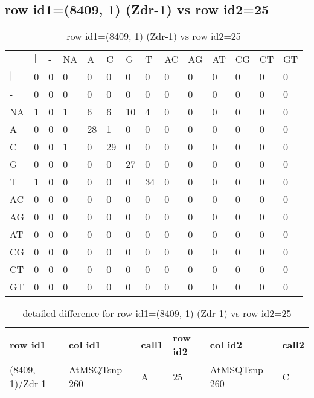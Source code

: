 \subsection{row id1=(8409, 1) (Zdr-1) vs row id2=25}
\begin{center}
\begin{longtable}{|l|l|l|l|l|l|l|l|l|l|l|l|l|l|}
\caption{row id1=(8409, 1) (Zdr-1) vs row id2=25} \label{table_dm680}\\
\hline
\\
\hline
&$|$&-&NA&A&C&G&T&AC&AG&AT&CG&CT&GT\\
$|$&0&0&0&0&0&0&0&0&0&0&0&0&0\\
-&0&0&0&0&0&0&0&0&0&0&0&0&0\\
NA&1&0&1&6&6&10&4&0&0&0&0&0&0\\
A&0&0&0&28&1&0&0&0&0&0&0&0&0\\
C&0&0&1&0&29&0&0&0&0&0&0&0&0\\
G&0&0&0&0&0&27&0&0&0&0&0&0&0\\
T&1&0&0&0&0&0&34&0&0&0&0&0&0\\
AC&0&0&0&0&0&0&0&0&0&0&0&0&0\\
AG&0&0&0&0&0&0&0&0&0&0&0&0&0\\
AT&0&0&0&0&0&0&0&0&0&0&0&0&0\\
CG&0&0&0&0&0&0&0&0&0&0&0&0&0\\
CT&0&0&0&0&0&0&0&0&0&0&0&0&0\\
GT&0&0&0&0&0&0&0&0&0&0&0&0&0\\
\hline
\end{longtable}
\end{center}

\begin{center}
\begin{longtable}{|l|l|l|l|l|l|}
\caption{detailed difference for row id1=(8409, 1) (Zdr-1) vs row id2=25} \label{table_dm681}\\
\hline
row id1&col id1&call1&row id2&col id2&call2\\
\hline
(8409, 1)/Zdr-1&AtMSQTsnp 260&A&25&AtMSQTsnp 260&C\\
\hline
\end{longtable}
\end{center}

